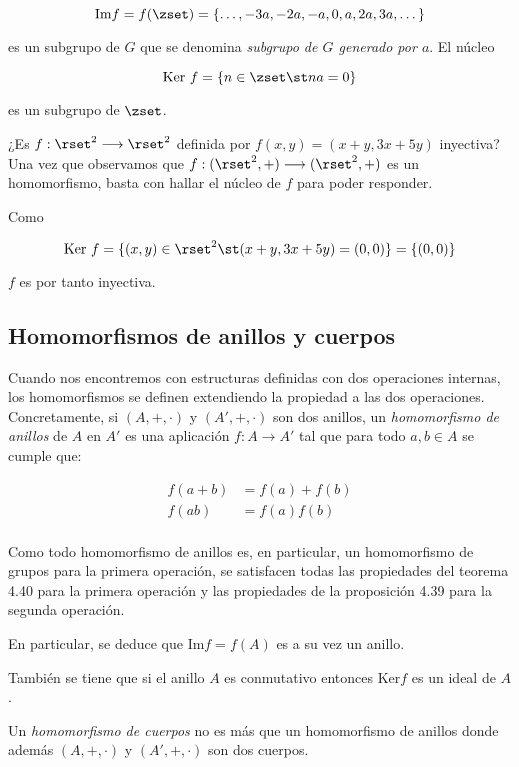 $$ \text{Im} f = f(\zset) = \{ \dots, -3a, -2a, -a, 0, a, 2a, 3a, \dots \}
$$

\noindent es un subgrupo de $G$ que se denomina \emph{subgrupo de $G$
generado por $a$}. El núcleo

$$ \text{Ker}\ f = \{ n \in \zset \st na = 0 \} $$

\noindent es un subgrupo de $\zset$.

¿Es $f: \rset^2 \longrightarrow \rset^2$ definida por $f(x,y) = (x + y, 3x +
5y)$ inyectiva? Una vez que observamos que $f : (\rset^2, +) \longrightarrow
(\rset^2, +)$ es un homomorfismo, basta con hallar el núcleo de $f$ para
poder responder.

Como

$$ \text{Ker}\ f = \{ (x,y) \in \rset^2 \st (x + y, 3x + 5y) = (0,0) \} =
\{(0,0)\} $$

\noindent $f$ es por tanto inyectiva.





\subsection{Homomorfismos de anillos y cuerpos}

Cuando nos encontremos con estructuras definidas con dos operaciones
internas, los homomorfismos se definen extendiendo la propiedad a las dos
operaciones. Concretamente, si $(A, +, \cdot)$ y $(A', +, \cdot)$ son dos
anillos, un \emph{homomorfismo de anillos} de $A$ en $A'$ es una
aplicación $f: A \longrightarrow A'$ tal que para todo $a, b \in A$ se
cumple que:

\begin{align*}
  f(a + b) &= f(a) + f(b) \\
  f(ab) &= f(a)f(b) \\
\end{align*}

Como todo homomorfismo de anillos es, en particular, un homomorfismo de
grupos para la primera operación, se satisfacen todas las propiedades del
teorema 4.40 para la primera operación y las propiedades de la proposición
4.39 para la segunda operación.

En particular, se deduce que $\text{Im} f = f(A)$ es a su vez un anillo.

También se tiene que si el anillo $A$ es conmutativo entonces $\text{Ker} f$
es un ideal de $A$.

Un \emph{homomorfismo de cuerpos} no es más que un homomorfismo de anillos
donde además $(A, +, \cdot)$ y $(A', +, \cdot)$ son dos cuerpos.







